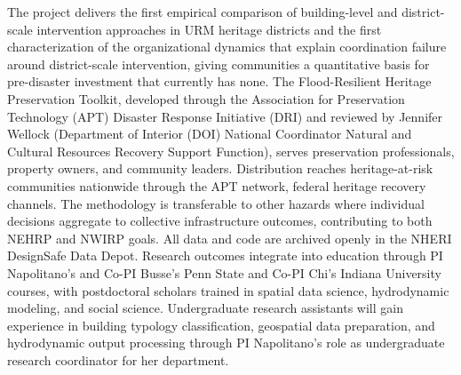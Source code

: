 \documentclass[11pt]{article}
\begin{document}
The project delivers the first empirical comparison of building-level and
district-scale intervention approaches in URM heritage districts and the
first characterization of the organizational dynamics that explain coordination
failure around district-scale intervention, giving communities a quantitative
basis for pre-disaster investment that currently has none. The
Flood-Resilient Heritage Preservation Toolkit, developed through the Association for Preservation Technology (APT) Disaster Response Initiative (DRI) and reviewed by Jennifer Wellock (Department of Interior (DOI) National Coordinator Natural and Cultural Resources Recovery Support Function), serves preservation professionals,
property owners, and community leaders. Distribution reaches heritage-at-risk communities nationwide through the APT network, federal
heritage recovery channels. The methodology is
transferable to other hazards where individual decisions aggregate to
collective infrastructure outcomes, contributing to both NEHRP and NWIRP
goals. All data and code are archived openly in the NHERI DesignSafe Data
Depot. Research outcomes integrate into education through PI Napolitano's and Co-PI Busse's Penn State and Co-PI Chi's Indiana University courses, with postdoctoral
scholars trained in spatial data science, hydrodynamic modeling, and social science. Undergraduate research assistants will
gain experience in building typology classification, geospatial data preparation, and hydrodynamic output processing through PI Napolitano's role as undergraduate research
coordinator for her department.
\end{document}
